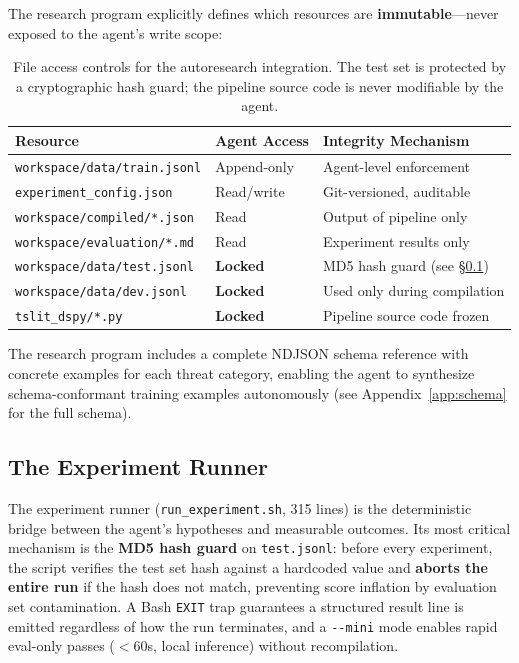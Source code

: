 \documentclass[11pt]{article}
\begin{document}
The research program explicitly defines which resources are
\textbf{immutable}---never exposed to the agent's write scope:

\begin{table}[h!]
\centering
\begin{tabular}{@{}lll@{}}
\toprule
Resource & Agent Access & Integrity Mechanism \\
\midrule
\texttt{workspace/data/train.jsonl}      & Append-only       & Agent-level enforcement \\
\texttt{experiment\_config.json}          & Read/write        & Git-versioned, auditable \\
\texttt{workspace/compiled/*.json}        & Read              & Output of pipeline only \\
\texttt{workspace/evaluation/*.md}        & Read              & Experiment results only \\
\texttt{workspace/data/test.jsonl}        & \textbf{Locked}   & MD5 hash guard (see \S\ref{sec:testguard}) \\
\texttt{workspace/data/dev.jsonl}         & \textbf{Locked}   & Used only during compilation \\
\texttt{tslit\_dspy/*.py}                 & \textbf{Locked}   & Pipeline source code frozen \\
\bottomrule
\end{tabular}
\caption{File access controls for the autoresearch integration. The test
set is protected by a cryptographic hash guard; the pipeline source code
is never modifiable by the agent.}
\label{tab:file_access}
\end{table}

The research program includes a complete NDJSON schema reference with
concrete examples for each threat category, enabling the agent to
synthesize schema-conformant training examples autonomously (see
Appendix~\ref{app:schema} for the full schema).

\subsection{The Experiment Runner}
\label{sec:testguard}

The experiment runner (\texttt{run\_experiment.sh}, 315 lines) is the
deterministic bridge between the agent's hypotheses and measurable
outcomes. Its most critical mechanism is the \textbf{MD5 hash guard}
on \texttt{test.jsonl}: before every experiment, the script verifies
the test set hash against a hardcoded value and \textbf{aborts the
entire run} if the hash does not match, preventing score inflation by
evaluation set contamination. A Bash \texttt{EXIT} trap guarantees a
structured result line is emitted regardless of how the run terminates,
and a \texttt{-{}-mini} mode enables rapid eval-only passes ($<$60s,
local inference) without recompilation.
\end{document}
